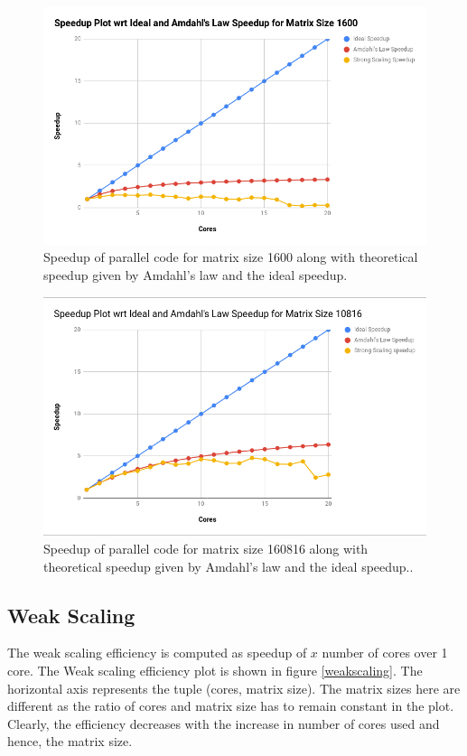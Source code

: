 \documentclass{article}
\begin{document}
\begin{spacing}{1.1}
\begin{center}
	\begin{figure}[H]
	\centering
       \includegraphics[scale=.40]{speedup1600.png}
        \caption{\label{Speedup1600} Speedup of parallel code for matrix size 1600 along with theoretical speedup given by Amdahl's law and the ideal speedup.} 
	\end{figure}
\end{center}

\begin{center}
	\begin{figure}[H]
	\centering
       \includegraphics[scale=.40]{speedup10816.png}
        \caption{\label{Speedup10816} Speedup of parallel code for matrix size 160816 along with theoretical speedup given by Amdahl's law and the ideal speedup..} 
	\end{figure}
\end{center}


\subsection{Weak Scaling}
The weak scaling efficiency is computed as speedup of $x$ number of cores over 1 core. 
The Weak scaling efficiency plot is shown in figure \ref{weakscaling}. The horizontal axis represents the tuple (cores, matrix size). The matrix sizes here are different as the ratio of cores and matrix size has to remain constant in the plot. Clearly, the efficiency decreases with the increase in number of cores used and hence, the matrix size.



\end{spacing}
\end{document}
